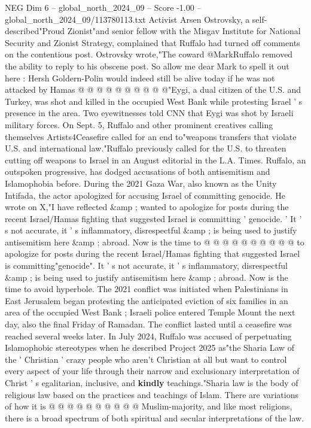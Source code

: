 \begin{textsample}{NEG Dim 6 – global\_north\_2024\_09 – Score -1.00 – global\_north\_2024\_09/113780113.txt}
Activist Arsen Ostrovsky, a self-described"Proud Zionist"and senior fellow with the Misgav Institute for National Security and Zionist Strategy, complained that Ruffalo had turned off comments on the contentious post.
Ostrovsky wrote,"The coward @MarkRuffalo removed the ability to reply to his obscene post.
So allow me dear Mark to spell it out here : Hersh Goldern-Polin would indeed still be alive today if he was not attacked by Hamas @ @ @ @ @ @ @ @ @ @"Eygi, a dual citizen of the U.S. and Turkey, was shot and killed in the occupied West Bank while protesting Israel ' s presence in the area.
Two eyewitnesses told CNN that Eygi was shot by Israeli military forces.
On Sept. 5, Ruffalo and other prominent creatives calling themselves Artists4Ceasefire called for an end to"weapons transfers that violate U.S. and international law."Ruffalo previously called for the U.S. to threaten cutting off weapons to Israel in an August editorial in the L.A.
Times.
Ruffalo, an outspoken progressive, has dodged accusations of both antisemitism and Islamophobia before.
During the 2021 Gaza War, also known as the Unity Intifada, the actor apologized for accusing Israel of committing genocide.
He wrote on X,"I have reflected \&amp ; wanted to apologize for posts during the recent Israel/Hamas fighting that suggested Israel is committing ' genocide. ' It ' s not accurate, it ' s inflammatory, disrespectful \&amp ; is being used to justify antisemitism here \&amp ; abroad.
Now is the time to @ @ @ @ @ @ @ @ @ @ to apologize for posts during the recent Israel/Hamas fighting that suggested Israel is committing"genocide".
It ' s not accurate, it ' s inflammatory, disrespectful \&amp ; is being used to justify antisemitism here \&amp ; abroad.
Now is the time to avoid hyperbole.
The 2021 conflict was initiated when Palestinians in East Jerusalem began protesting the anticipated eviction of six families in an area of the occupied West Bank ; Israeli police entered Temple Mount the next day, also the final Friday of Ramadan.
The conflict lasted until a ceasefire was reached several weeks later.
In July 2024, Ruffalo was accused of perpetuating Islamophobic stereotypes when he described Project 2025 as"the Sharia Law of the ' Christian ' crazy people who aren't Christian at all but want to control every aspect of your life through their narrow and exclusionary interpretation of Christ ' s egalitarian, inclusive, and \textbf{kindly} teachings."Sharia law is the body of religious law based on the practices and teachings of Islam.
There are variations of how it is @ @ @ @ @ @ @ @ @ @ Muslim-majority, and like most religions, there is a broad spectrum of both spiritual and secular interpretations of the law.

\end{textsample}
